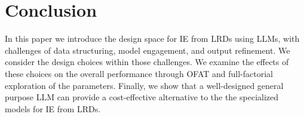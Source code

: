 \section{Conclusion}
\label{sec:conclusion}

In this paper we introduce the design space for IE from LRDs using LLMs, with challenges of data structuring, model engagement, and output refinement. We consider the design choices within those challenges. We examine the effects of these choices on the overall performance through OFAT and full-factorial exploration of the parameters. Finally, we show that a well-designed general purpose LLM can provide a cost-effective alternative to the the specialized models for IE from LRDs.
